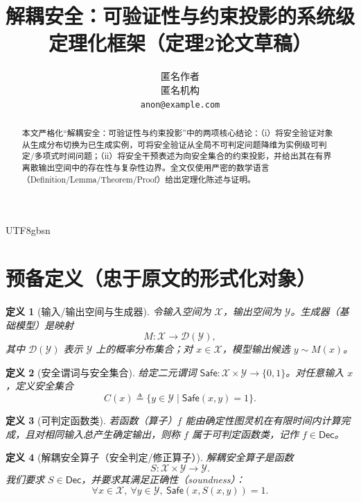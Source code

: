 \documentclass[letterpaper,twocolumn,10pt]{article}
\newtheorem{definition}{定义}
\newcommand{\Safe}{\mathsf{Safe}}
\newcommand{\Dec}{\mathsf{Dec}}
\newcommand{\Out}{\mathcal{Y}}
\newcommand{\In}{\mathcal{X}}
\begin{document}
\begin{CJK}{UTF8}{gbsn}

\title{解耦安全：可验证性与约束投影的系统级定理化框架（定理2论文草稿）}

\author{匿名作者\\匿名机构\\\texttt{anon@example.com}}

\maketitle

\begin{abstract}
本文严格化“解耦安全：可验证性与约束投影”中的两项核心结论：（i）将安全验证对象从生成分布切换为已生成实例，可将安全验证从全局不可判定问题降维为实例级可判定/多项式时间问题；（ii）将安全干预表述为向安全集合的约束投影，并给出其在有界离散输出空间中的存在性与复杂性边界。全文仅使用严密的数学语言（Definition/Lemma/Theorem/Proof）给出定理化陈述与证明。
\end{abstract}

\section{预备定义（忠于原文的形式化对象）}
\begin{definition}[输入/输出空间与生成器]\label{def:spaces}
令输入空间为 $\In$，输出空间为 $\Out$。生成器（基础模型）是映射
\[
M:\In\to \mathcal{D}(\Out),
\]
其中 $\mathcal{D}(\Out)$ 表示 $\Out$ 上的概率分布集合；对 $x\in\In$，模型输出候选 $y\sim M(x)$。
\end{definition}

\begin{definition}[安全谓词与安全集合]\label{def:safe-set}
给定二元谓词 $\Safe:\In\times\Out\to\{0,1\}$。对任意输入 $x$，定义安全集合
\[
C(x)\triangleq \{y\in\Out\mid \Safe(x,y)=1\}.
\]
\end{definition}

\begin{definition}[可判定函数类]\label{def:decidable-class}
若函数（算子）$f$ 能由确定性图灵机在有限时间内计算完成，且对相同输入总产生确定输出，则称 $f$ 属于可判定函数类，记作 $f\in\Dec$。
\end{definition}

\begin{definition}[解耦安全算子（安全判定/修正算子）]\label{def:ds-operator}
解耦安全算子是函数
\[
S:\In\times \Out\to \Out.
\]
我们要求 $S\in\Dec$，并要求其满足\emph{正确性}（soundness）：
\[
\forall x\in\In,\ \forall y\in\Out,\ \Safe(x,S(x,y))=1.
\]
\end{definition}


\end{CJK}
\end{document}
